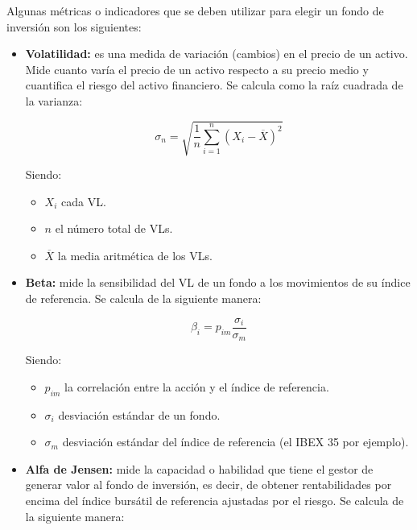 \documentclass[12pt, a4paper]{book}
\begin{document}
Algunas métricas o indicadores que se deben utilizar para elegir un fondo de inversión son los siguientes:

\begin{itemize}
	\item \textbf{Volatilidad:} es una medida de variación (cambios) en el precio de un activo. Mide cuanto varía el precio de un activo respecto a su precio medio y cuantifica el riesgo del activo financiero. Se calcula como la raíz cuadrada de la varianza:
	
	\begin{center}
		\begin{equation}
		\sigma _{n}={\sqrt{{\frac {1}{n}}\sum _{i=1}^{n}\left(X_{i}-{\overline {X}}\right)^{2}}}
		\end{equation}
	\end{center}
	
	Siendo:
	\begin{itemize}
		\item  $X_{i}$ cada \gls{VL}.
		\item  $n$ el número total de \gls{VL}s.
		\item  $\overline {X}$ la media aritmética de los \gls{VL}s.\\
	\end{itemize}
	
	
	\item \textbf{Beta:} mide la sensibilidad del \gls{VL} de un fondo a los movimientos de su índice de referencia. Se calcula de la siguiente manera:
	
	\begin{center}
		\begin{equation}
		\beta _{i}=p_{im}\frac{\sigma _{i}}{\sigma _{m}}
		\end{equation}
	\end{center}
	
	Siendo: 
	\begin{itemize}
		\item $p_{im}$ la correlación entre la acción y el índice de referencia.
		\item $\sigma _{i}$ desviación estándar de un fondo. 
		\item $\sigma _{m} $ desviación estándar del índice de referencia (el IBEX 35 por ejemplo).\\ 
	\end{itemize}
	
	
	\item \textbf{Alfa de Jensen:} mide la capacidad o habilidad que tiene el gestor de generar valor al fondo de inversión, es decir, de obtener rentabilidades por encima del índice bursátil de referencia ajustadas por el riesgo. Se calcula de la siguiente manera:
	

\end{itemize}
\end{document}
